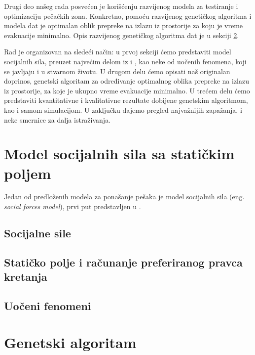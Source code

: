 \documentclass[12pt]{article}
\begin{document}
Drugi deo našeg rada posvećen je korišćenju razvijenog modela za testiranje i optimizaciju pečaćkih zona. Konkretno, pomoću razvijenog genetičkog algoritma i modela dat je optimalan oblik prepreke na izlazu iz prostorije za koju je vreme evakuacije minimalno. Opis razvijenog genetičkog algoritma dat je u sekciji \ref{GA}. 

Rad je organizovan na sledeći način: u prvoj sekciji ćemo predstaviti model socijalnih sila, preuzet najvećim delom iz \citep{Helbing1998} i \citep{Helbing2002}, kao neke od uočenih fenomena, koji se javljaju i u stvarnom životu. U drugom delu ćemo opisati naš originalan doprinos, genetski algoritam za određivanje optimalnog oblika prepreke na izlazu iz prostorije, za koje je ukupno vreme evakuacije minimalno. U trećem delu ćemo predstaviti kvantitativne i kvalitativne rezultate dobijene genetskim algoritmom, kao i samom simulacijom. U zaključku dajemo pregled najvažnijih zapažanja, i neke smernice za dalja istraživanja.

\section{Model socijalnih sila sa statičkim poljem}
\label{sile}

Jedan od predloženih modela za ponašanje pešaka je model socijalnih sila (eng. \emph{social forces model}), prvi put predstavljen u \cite{Helbing1994}.

    \subsection{Socijalne sile}
    \subsection{Statičko polje i računanje preferiranog pravca kretanja}
    \subsection{Uočeni fenomeni}
    
    \label{fenomeni}

\section{Genetski algoritam}\label{GA}
\end{document}
